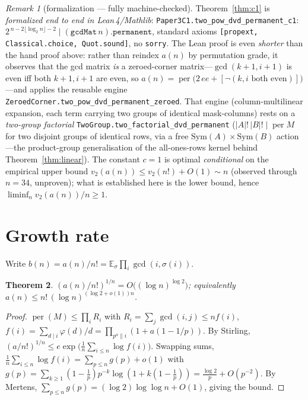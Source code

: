\documentclass[11pt]{article}
\newtheorem{theorem}{Theorem}
\theoremstyle{remark}\newtheorem{remark}[theorem]{Remark}
\DeclareMathOperator{\perm}{per}
\begin{document}
\begin{remark}[formalization --- fully machine-checked]
Theorem~\ref{thm:c1} is \emph{formalized end to end in Lean\,4/Mathlib}:
\texttt{Paper3C1.two\_pow\_dvd\_permanent\_c1}:
$2^{\,n-2\lfloor\log_2 n\rfloor-2}\mid(\mathtt{gcdMat}\,n).\mathtt{permanent}$, standard axioms
\texttt{[propext, Classical.choice, Quot.sound]}, no \texttt{sorry}. The Lean proof is even
\emph{shorter} than the hand proof above: rather than reindex $a(n)$ by permutation grade, it
observes that the gcd matrix \emph{is} a zeroed-corner matrix---$\gcd(k{+}1,i{+}1)$ is even iff
both $k{+}1,i{+}1$ are even, so $a(n)=\perm\!\bigl(2\,ee+[\neg(k,i\text{ both even})]\bigr)$---and
applies the reusable engine \texttt{ZeroedCorner.two\_pow\_dvd\_permanent\_zeroed}. That engine
(column-multilinear expansion, each term carrying two groups of identical mask-columns) rests on a
\emph{two-group factorial} \texttt{TwoGroup.two\_factorial\_dvd\_permanent}
($|A|!\,|B|!\mid\perm M$ for two disjoint groups of identical rows, via a free
$\mathrm{Sym}(A)\times\mathrm{Sym}(B)$ action---the product-group generalisation of the
all-ones-rows kernel behind Theorem~\ref{thm:linear}). The constant $c=1$ is optimal
\emph{conditional} on the empirical upper bound $v_2(a(n))\le v_2(n!)+O(1)\sim n$ (observed through
$n=34$, unproven); what is established here is the lower bound, hence $\liminf_n v_2(a(n))/n\ge1$.
\end{remark}

\section{Growth rate}
Write $b(n)=a(n)/n!=\mathbb E_\sigma\prod_i\gcd(i,\sigma(i))$.

\begin{theorem}\label{thm:up}
$(a(n)/n!)^{1/n}=O\big((\log n)^{\log 2}\big)$; equivalently
$a(n)\le n!\,(\log n)^{(\log 2+o(1))n}$.
\end{theorem}
\begin{proof}
$\perm(M)\le\prod_i R_i$ with $R_i=\sum_j\gcd(i,j)\le n f(i)$,
$f(i)=\sum_{d\mid i}\varphi(d)/d=\prod_{p^a\|i}(1+a(1-1/p))$. By Stirling,
$(a/n!)^{1/n}\le e\exp\big(\tfrac1n\sum_{i\le n}\log f(i)\big)$. Swapping sums,
$\tfrac1n\sum_{i\le n}\log f(i)=\sum_{p\le n}g(p)+o(1)$ with
$g(p)=\sum_{k\ge1}(1-\tfrac1p)p^{-k}\log(1+k(1-\tfrac1p))=\tfrac{\log2}{p}
+O(p^{-2})$. By Mertens, $\sum_{p\le n}g(p)=(\log2)\log\log n+O(1)$, giving the
bound.
\end{proof}
\end{document}
